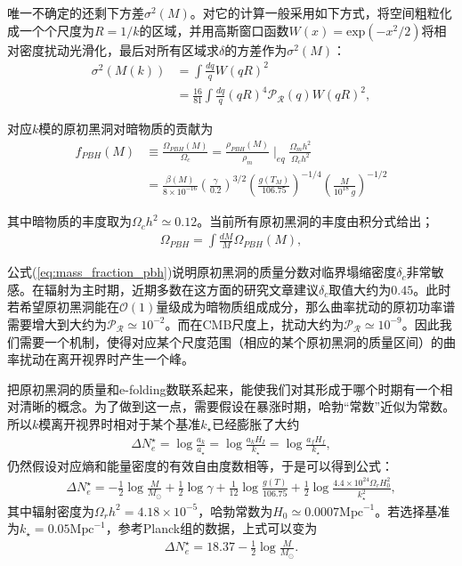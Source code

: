 唯一不确定的还剩下方差$\sigma^2(M)$。对它的计算一般采用如下方式，将空间粗粒化成一个个尺度为$R=1/k$的区域，并用高斯窗口函数$W(x)=\text{exp}(-x^2/2)$将相对密度扰动光滑化，最后对所有区域求$\delta$的方差作为$\sigma^2(M)$：
\begin{align}
    \sigma^2(M(k)) &= \int \frac{dq}{q}W{(qR)}^2 \\
    &= \frac{16}{81}\int \frac{dq}{q} {(qR)}^4 \mathcal{P_R}(q)W{(qR)}^2,
\end{align}

对应$k$模的原初黑洞对暗物质的贡献为
\begin{align*}
    f_{PBH}(M) &\equiv \frac{\Omega_{PBH}(M)}{\Omega_c} =
    \frac{\rho_{PBH}(M)}{\rho_m}\mid_{eq}\frac{\Omega_m h^2}{\Omega_c h^2}
    \\
    &= \frac{\beta(M)}{8\times
    10^{-16}}{\left(\frac{\gamma}{0.2}\right)}^{3/2}{\left(\frac{g(T_M)}{106.75}\right)}^{-1/4}{\left(\frac{M}{10^{18}\ g}\right)}^{-1/2}
\end{align*}

其中暗物质的丰度取为$\Omega_c h^2 \simeq 0.12$\citep{aghanim2018planck}。当前所有原初黑洞的丰度由积分式给出；
\begin{align}
    \label{eq:abundence_pbh}
    \Omega_{PBH} = \int \frac{dM}{M}\Omega_{PBH}(M),
\end{align}

公式{(\ref{eq:mass_fraction_pbh})}说明原初黑洞的质量分数对临界塌缩密度$\delta_c$非常敏感。在辐射为主时期，近期多数在这方面的研究文章\citep{musco2005computations,musco2009primordial,musco2013primordial,harada2013threshold}建议$\delta_c$取值大约为$0.45$。此时若希望原初黑洞能在$\mathcal{O}(1)$量级成为暗物质组成成分，那么曲率扰动的原初功率谱需要增大到大约为$\mathcal{P_R}\simeq
10^{-2}$。而在CMB尺度上，扰动大约为$\mathcal{P_R}\simeq
10^{-9}$。因此我们需要一个机制，使得对应某个尺度范围（相应的某个原初黑洞的质量区间）的曲率扰动在离开视界时产生一个峰。

把原初黑洞的质量和e-folding数联系起来，能使我们对其形成于哪个时期有一个相对清晰的概念。为了做到这一点，需要假设在暴涨时期，哈勃“常数”近似为常数。所以$k$模离开视界时相对于某个基准$k_\star$已经膨胀了大约
\begin{align}
    \label{eq:delta_efolding}
    \Delta N^{\star}_e = \log \frac{a_k}{a_\star} = \log\frac{a_k
    H_I}{k_\star} = \log \frac{a_f H_f}{k_\star},
\end{align}
仍然假设对应熵和能量密度的有效自由度数相等，于是可以得到公式\citep{motohashi2017primordial}：
\begin{align}
    \Delta N^{\star}_e =
    -\frac{1}{2}\log\frac{M}{M_\odot}+\frac{1}{2}\log\gamma
    +\frac{1}{12}\log\frac{g(T)}{106.75}+\frac{1}{2}\log\frac{4.4\times10^{24}\Omega_r
    H^2_0}{k^2_{\star}}, 
\end{align}
其中辐射密度为$\Omega_r h^2=4.18\times10^{-5}$，哈勃常数为$H_0\simeq
0.0007\text{Mpc}^{-1}$。若选择基准为$k_\star =
  0.05\text{Mpc}^{-1}$，参考Planck组的数据，上式可以变为
\begin{align}
    \Delta N^{\star}_e = 18.37-\frac{1}{2}\log\frac{M}{M_\odot}.
\end{align}


